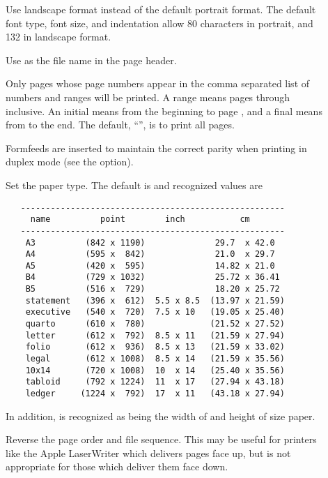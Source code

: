 \begin{description}
\item[]
   Use landscape format instead of the default portrait format.  The default
   font type, font size, and indentation allow 80 characters in portrait, and
   132 in landscape format.

\item[]
   Use  as the file name in the page header.

\item[]
   Only pages whose page numbers appear in the comma separated list of numbers
   and ranges will be printed.  A range  means pages  through
    inclusive.  An initial  means from the beginning to page
   , and a final  means from  to the end.  The
   default, ``\code{:}'', is to print all pages.

   Formfeeds are inserted to maintain the correct parity when printing in
   duplex mode (see the  option).

\item[\code{\#}]
   Set the paper type.  The default is  and recognized values are

\begin{verbatim}
   -----------------------------------------------------
     name          point        inch           cm
   -----------------------------------------------------
    A3          (842 x 1190)              29.7  x 42.0
    A4          (595 x  842)              21.0  x 29.7
    A5          (420 x  595)              14.82 x 21.0
    B4          (729 x 1032)              25.72 x 36.41
    B5          (516 x  729)              18.20 x 25.72
    statement   (396 x  612)  5.5 x 8.5  (13.97 x 21.59)
    executive   (540 x  720)  7.5 x 10   (19.05 x 25.40)
    quarto      (610 x  780)             (21.52 x 27.52)
    letter      (612 x  792)  8.5 x 11   (21.59 x 27.94)
    folio       (612 x  936)  8.5 x 13   (21.59 x 33.02)
    legal       (612 x 1008)  8.5 x 14   (21.59 x 35.56)
    10x14       (720 x 1008)  10  x 14   (25.40 x 35.56)
    tabloid     (792 x 1224)  11  x 17   (27.94 x 43.18)
    ledger     (1224 x  792)  17  x 11   (43.18 x 27.94)
\end{verbatim}

   \noindent
   In addition,  is recognized as being the width of 
   and height of  size paper.

\item[]
   Reverse the page order and file sequence.  This may be useful for printers
   like the Apple LaserWriter which delivers pages face up, but is not
   appropriate for those which deliver them face down.


\end{description}
